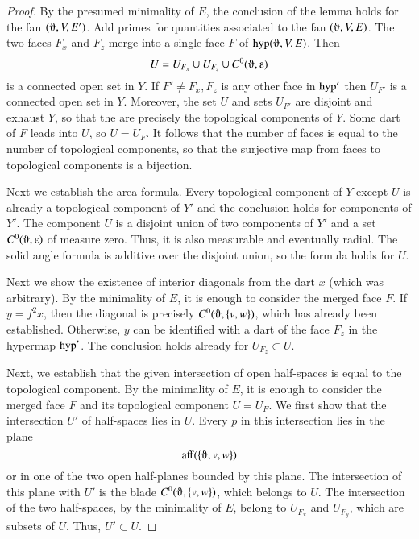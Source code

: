 \begin{proof}
By the presumed minimality of $E$, the conclusion of the lemma holds for the
fan $(\orgn,V,E')$.  Add primes
for quantities associated to the fan $(\orgn,V,E)$.  The two faces
$F_x$ and $F_z$ merge into a single face $F$ of $\op{hyp}(\orgn,V,E)$.
Then 
\begin{equation}\label{eqn:U}
U= U_{F_x}\cup U_{F_z}\cup C^0(\orgn,\e)
\end{equation} 
is a connected open set in $Y$.
If $F'\ne F_x,F_z$ is any other face in ${\operatorname{hyp}}'$ then $U_{F'}$ is
a connected open set in $Y$.  Moreover, the set $U$ and sets $U_{F'}$
are disjoint and exhaust $Y$, so that the are precisely the topological
components of $Y$.  Some dart of $F$ leads into $U$, so $U=U_F$.  It follows
that the number of faces is equal to the number of topological components, so that the surjective map from faces to topological components is a bijection.

Next we establish the area formula.  Every topological component of $Y$ 
except $U$ is already a topological component of $Y'$ and the conclusion
holds for components of $Y'$.  The component $U$ is a disjoint union of two
components of $Y'$ and a set $C^0(\orgn,\e)$ of measure zero.  Thus, it
is also measurable and eventually radial.  The solid angle formula is
additive over the disjoint union, so the formula holds for $U$.

Next we show the existence of interior diagonals from the dart $x$ (which was arbitrary).  By the minimality of $E$, it is enough to consider the merged face $F$.  
If $y=f^2x$, then the diagonal is precisely $C^0(\orgn,\{v,w\})$,
which has already been established.  Otherwise, $y$ can be identified with
a dart of the face $F_z$ in the hypermap ${\operatorname{hyp}}'$.  The conclusion holds
already for $U_{F_z}\subset U$.  


Next, we establish that the given intersection of open half-spaces is equal
to the topological component. By the minimality of $E$, it is enough to consider
the merged face $F$ and its topological component $U=U_F$.
We first show that the intersection $U'$ of half-spaces lies in $U$.
Every $p$ in this intersection lies in the plane
$$
\op{aff}(\{\orgn,v,w\})
$$
or in one of the two open half-planes bounded by this plane.  The intersection
of this plane with $U'$ is the blade $C^0(\orgn,\{v,w\})$, which belongs
to $U$. The intersection of the two half-spaces, by the minimality of $E$,
belong to $U_{F_x}$ and $U_{F_y}$, which are subsets of $U$.  Thus, $U'\subset U$.


\end{proof}
